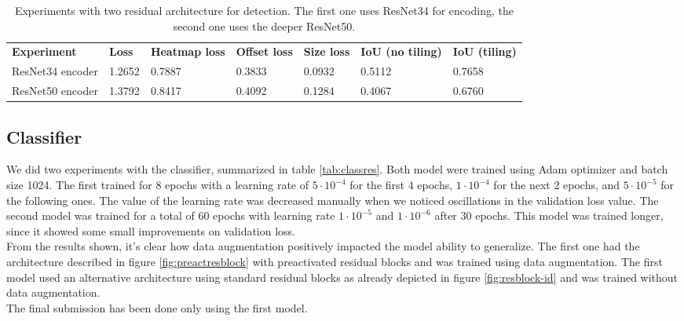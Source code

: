\begin{table*}[h]
	\begin{tabular}{lllllll}
		\rowcolor[HTML]{EFEFEF} 
		\textbf{Experiment}   & \textbf{Loss} & \textbf{Heatmap loss} & \textbf{Offset loss} & \textbf{Size loss} & \textbf{IoU (no tiling)} & \textbf{IoU (tiling)} \\
		ResNet34 encoder      & 1.2652        & 0.7887                & 0.3833               & 0.0932             & 0.5112                   & 0.7658                \\
		ResNet50 encoder      & 1.3792        & 0.8417                & 0.4092               & 0.1284             & 0.4067                   & 0.6760
	\end{tabular}
	\caption{Experiments with two residual architecture for detection. The first one uses ResNet34 for encoding, the second one uses the deeper ResNet50.}
	\label{tab:expdetector}
\end{table*}

\subsection{Classifier}
\label{ssec:classifierexp}

We did two experiments with the classifier, summarized in table \ref{tab:classres}. Both model were trained using Adam optimizer and batch size 1024. The first trained for 8 epochs with a learning rate of $5 \cdot 10^{-4}$ for the first 4 epochs, $1 \cdot 10^{-4}$ for the next 2 epochs, and $5 \cdot 10^{-5}$ for the following ones. The value of the learning rate was decreased manually when we noticed oscillations in the validation loss value. The second model was trained for a total of 60 epochs with learning rate $1 \cdot 10^{-5}$ and $1 \cdot 10^{-6}$ after 30 epochs. This model was trained longer, since it showed some small improvements on validation loss.\\ From the results shown, it's clear how data augmentation positively impacted the model ability to generalize.
The first one had the architecture described in figure \ref{fig:preactresblock} with preactivated residual blocks and was trained using data augmentation. The first model used an alternative architecture using standard residual blocks as already depicted in figure \ref{fig:resblock-id} and was trained without data augmentation.\\
The final submission has been done only using the first model.

